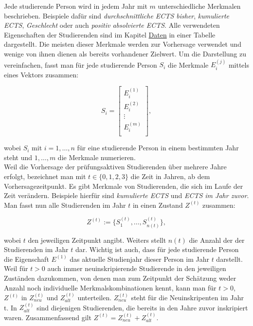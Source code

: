 Jede studierende Person wird in jedem Jahr mit $m$ unterschiedliche Merkmalen beschrieben. Beispiele daf\"ur sind \textit{\glqq durchschnittliche ECTS bisher\grqq{}},
\textit{\glqq kumulierte ECTS\grqq{}}, \textit{\glqq Geschlecht\grqq{}} oder auch \textit{\glqq positiv absolvierte ECTS\grqq{}}. Alle verwendeten Eigenschaften der
Studierenden sind im Kapitel \hyperref[sec:daten]{Daten} in einer Tabelle dargestellt. Die meisten dieser Merkmale werden zur
Vorhersage verwendet und wenige von ihnen dienen als bereits vorhandener Zielwert. Um die Darstellung zu vereinfachen, fasst man f\"ur
jede studierende Person $S_i$ die Merkmale $E_i^{(j)}$ mittels eines Vektors zusammen:

$$S_i = \begin{bmatrix}
		E_i^{(1)} \\
		E_i^{(2)} \\
		\vdots    \\
		E_i^{(m)} \\
	\end{bmatrix}, $$

wobei $S_i$ mit $i = 1,\dots,n$ f\"ur eine studierende Person in einem bestimmten Jahr steht und $1,\dots,m$ die Merkmale numerieren. \\

Weil die Vorhersage der pr\"ufungsaktiven Studierenden \"uber mehrere Jahre erfolgt, bezeichnet man
mit $t \in \{0,1,2,3\}$ die Zeit in Jahren, ab dem Vorhersagezeitpunkt. Es gibt Merkmale von Studierenden, die sich im Laufe der Zeit
ver\"andern. Beispiele hierf\"ur sind \textit{\glqq kumulierte ECTS\grqq{}} und \textit{\glqq ECTS im Jahr zuvor\grqq{}}. Man fasst nun alle
Studierenden im Jahr $t$ in einen Zustand $Z^{(t)}$ zusammen:

$$Z^{(t)} := \{S_1^{(t)}, \dots ,S_{n(t)}^{(t)}\},$$

wobei $t$ den jeweiligen Zeitpunkt angibt. Weiters stellt $n(t)$ die Anzahl der der Studierenden im
Jahr $t$ dar. Wichtig ist auch, dass f\"ur jede studierende Person die Eigenschaft $E^{(1)}$ das aktuelle Studienjahr
dieser Person im Jahr $t$ darstellt. \\



Weil für $t>0$ auch immer neuinskripierende Studierende in den jeweiligen Zuständen dazukommen, von denen man zum Zeitpunkt der Sch\"atzung weder
Anzahl noch individuelle Merkmalskombinationen kennt, kann man für $t>0$, $Z^{(t)}$ in $Z_{neu}^{(t)}$ und $Z_{alt}^{(t)}$ unterteilen.
$Z_{neu}^{(t)}$ steht f\"ur die Neuinskripenten im Jahr t.
In $Z_{alt}^{(t)}$ sind diejenigen Studierenden, die bereits in den Jahre zuvor inskripiert waren.
Zusammenfassend gilt $Z^{(t)} = Z_{neu}^{(t)} + Z_{alt}^{(t)}$.  \\

